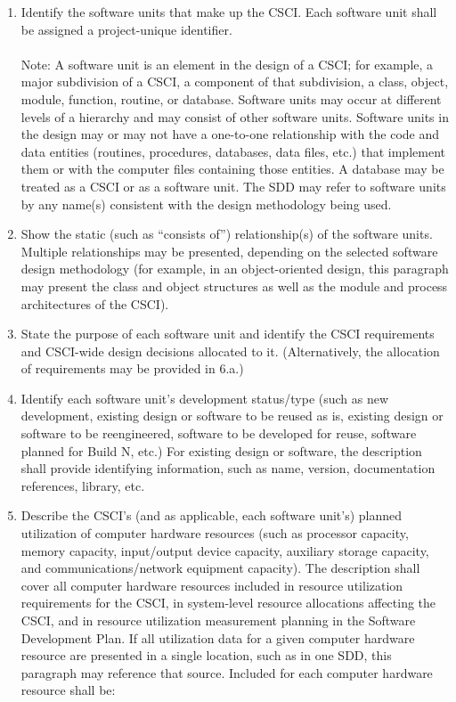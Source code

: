 \begin{enumerate}
\itemsep1pt\parskip0pt
\item
  Identify the software units that make up the CSCI. Each software unit
  shall be assigned a project-unique identifier. \\\\ Note: A software
  unit is an element in the design of a CSCI; for example, a major
  subdivision of a CSCI, a component of that subdivision, a class,
  object, module, function, routine, or database. Software units may
  occur at different levels of a hierarchy and may consist of other
  software units. Software units in the design may or may not have a
  one-to-one relationship with the code and data entities (routines,
  procedures, databases, data files, etc.) that implement them or with
  the computer files containing those entities. A database may be
  treated as a CSCI or as a software unit. The SDD may refer to software
  units by any name(s) consistent with the design methodology being
  used.
\item
  Show the static (such as ``consists of'') relationship(s) of the
  software units. Multiple relationships may be presented, depending on
  the selected software design methodology (for example, in an
  object-oriented design, this paragraph may present the class and
  object structures as well as the module and process architectures of
  the CSCI).
\item
  State the purpose of each software unit and identify the CSCI
  requirements and CSCI-wide design decisions allocated to it.
  (Alternatively, the allocation of requirements may be provided in
  6.a.)
\item
  Identify each software unit's development status/type (such as new
  development, existing design or software to be reused as is, existing
  design or software to be reengineered, software to be developed for
  reuse, software planned for Build N, etc.) For existing design or
  software, the description shall provide identifying information, such
  as name, version, documentation references, library, etc.
\item
  Describe the CSCI's (and as applicable, each software unit's) planned
  utilization of computer hardware resources (such as processor
  capacity, memory capacity, input/output device capacity, auxiliary
  storage capacity, and communications/network equipment capacity). The
  description shall cover all computer hardware resources included in
  resource utilization requirements for the CSCI, in system-level
  resource allocations affecting the CSCI, and in resource utilization
  measurement planning in the Software Development Plan. If all
  utilization data for a given computer hardware resource are presented
  in a single location, such as in one SDD, this paragraph may reference
  that source. Included for each computer hardware resource shall be:


\end{enumerate}
